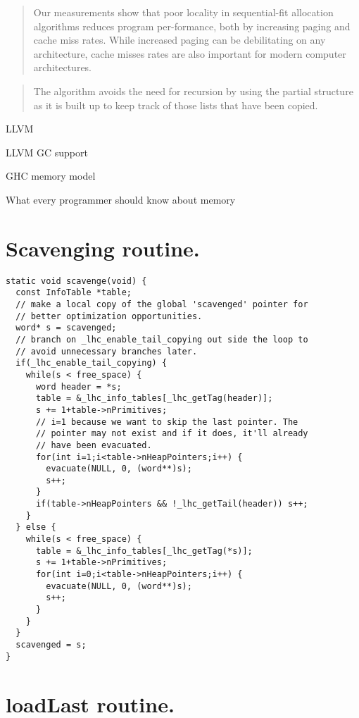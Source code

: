 \documentclass[a4paper,oneside]{memoir}
\begin{document}
\blockquote{Our measurements show that poor locality in sequential-fit
allocation algorithms reduces program per-formance, both by increasing paging
and cache miss rates. While increased paging can be debilitating on any
architecture, cache misses rates are also important for modern computer
architectures. \cite{Grunwald:1993}}

\blockquote{The algorithm avoids the need for recursion by using the partial
structure as it is built up to keep track of those lists that have been copied.}
\cite{Cheney:1970}

LLVM\cite{LLVM}

LLVM GC support\cite{LLVMGC}

GHC memory model \cite{GHCCommentary}

What every programmer should know about memory \cite{Drepper}




\appendix

\chapter{Scavenging routine.}
\label{scavenge_code}

\begin{lstlisting}
static void scavenge(void) {
  const InfoTable *table;
  // make a local copy of the global 'scavenged' pointer for
  // better optimization opportunities.
  word* s = scavenged;
  // branch on _lhc_enable_tail_copying out side the loop to
  // avoid unnecessary branches later.
  if(_lhc_enable_tail_copying) {
    while(s < free_space) {
      word header = *s;
      table = &_lhc_info_tables[_lhc_getTag(header)];
      s += 1+table->nPrimitives;
      // i=1 because we want to skip the last pointer. The
      // pointer may not exist and if it does, it'll already
      // have been evacuated.
      for(int i=1;i<table->nHeapPointers;i++) {
        evacuate(NULL, 0, (word**)s);
        s++;
      }
      if(table->nHeapPointers && !_lhc_getTail(header)) s++;
    }
  } else {
    while(s < free_space) {
      table = &_lhc_info_tables[_lhc_getTag(*s)];
      s += 1+table->nPrimitives;
      for(int i=0;i<table->nHeapPointers;i++) {
        evacuate(NULL, 0, (word**)s);
        s++;
      }
    }
  }
  scavenged = s;
}
\end{lstlisting}

\chapter{loadLast routine.}
\label{loadLast_code}
\end{document}
